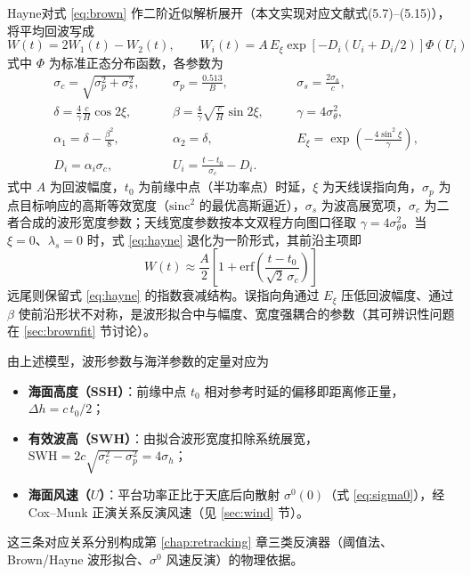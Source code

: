 \documentclass[a4paper]{article}
\begin{document}
Hayne\cite{hayne1980}对式 \eqref{eq:brown} 作二阶近似解析展开（本文实现对应文献\cite{refpaper}式(5.7)--(5.15)），将平均回波写成
\begin{equation}
	W(t) = 2 W_1(t) - W_2(t), \qquad W_i(t) = A\, E_\xi \exp\!\left[ -D_i \left( U_i + D_i / 2 \right) \right] \Phi(U_i)
	\label{eq:hayne}
\end{equation}
式中 $\Phi$ 为标准正态分布函数，各参数为
\begin{equation}
\begin{aligned}
	&\sigma_c = \sqrt{\sigma_p^{2} + \sigma_s^{2}}, \quad &&\sigma_p = \frac{0.513}{B}, \quad &&\sigma_s = \frac{2 \sigma_h}{c}, \\
	&\delta = \frac{4}{\gamma} \frac{c}{H} \cos 2 \xi, \quad &&\beta = \frac{4}{\gamma} \sqrt{\frac{c}{H}} \sin 2 \xi, \quad &&\gamma = 4 \sigma_\theta^{2}, \\
	&\alpha_1 = \delta - \frac{\beta^{2}}{8}, \quad &&\alpha_2 = \delta, \quad &&E_\xi = \exp\!\left( -\frac{4 \sin^{2} \xi}{\gamma} \right), \\
	&D_i = \alpha_i \sigma_c, \quad &&U_i = \frac{t - t_0}{\sigma_c} - D_i . &&
\end{aligned}
\label{eq:hayneparams}
\end{equation}
式中 $A$ 为回波幅度，$t_0$ 为前缘中点（半功率点）时延，$\xi$ 为天线误指向角，$\sigma_p$ 为点目标响应的高斯等效宽度（$\mathrm{sinc}^2$ 的最优高斯逼近），$\sigma_s$ 为波高展宽项，$\sigma_c$ 为二者合成的波形宽度参数；天线宽度参数按本文双程方向图口径取 $\gamma = 4 \sigma_\theta^{2}$。当 $\xi = 0$、$\lambda_s = 0$ 时，式 \eqref{eq:hayne} 退化为一阶形式，其前沿主项即
\begin{equation}
	W(t) \approx \frac{A}{2} \left[ 1 + \mathrm{erf} \!\left( \frac{t - t_0}{\sqrt{2}\, \sigma_c} \right) \right]
	\label{eq:erf}
\end{equation}
远尾则保留式 \eqref{eq:hayne} 的指数衰减结构。误指向角通过 $E_\xi$ 压低回波幅度、通过 $\beta$ 使前沿形状不对称，是波形拟合中与幅度、宽度强耦合的参数（其可辨识性问题在 \ref{sec:brownfit} 节讨论）。

由上述模型，波形参数与海洋参数的定量对应为
\begin{itemize}
	\item \textbf{海面高度（SSH）}：前缘中点 $t_0$ 相对参考时延的偏移即距离修正量，$\Delta h = c\, t_0 / 2$；
	\item \textbf{有效波高（SWH）}：由拟合波形宽度扣除系统展宽，$\mathrm{SWH} = 2 c \sqrt{\sigma_c^{2} - \sigma_p^{2}} = 4 \sigma_h$；
	\item \textbf{海面风速（$U$）}：平台功率正比于天底后向散射 $\sigma^0(0)$（式 \eqref{eq:sigma0}），经 Cox--Munk 正演关系反演风速（见 \ref{sec:wind} 节）。
\end{itemize}
这三条对应关系分别构成第 \ref{chap:retracking} 章三类反演器（阈值法、Brown/Hayne 波形拟合、$\sigma^0$ 风速反演）的物理依据。
\end{document}
